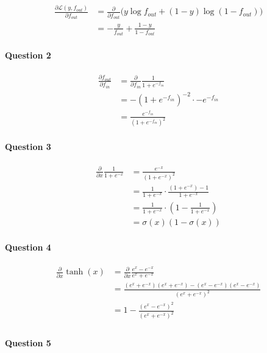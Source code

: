 \documentclass[
  a4paper,
]{article}
\begin{document}
\begin{align*}
\frac{\partial\mathcal{L}(y,  f_{out})}{\partial f_{out}}
&=\frac{\partial}{\partial f_{out}}\bigg(y\log f_{out}+(1-y)\log(1- f_{out})\bigg)\\
&=-\frac{y}{ f_{out}}+\frac{1-y}{1- f_{out}}
\end{align*}

\hypertarget{question-2}{%
\paragraph{Question 2}\label{question-2}}

\begin{align*}
\frac{\partial f_{out}}{\partial f_{in}}
&=\frac{\partial}{\partial f_{in}} \frac{1}{1+e^{- f_{in}}} \\
&=-(1+e^{- f_{in}})^{-2}\cdot -e^{- f_{in}} \\
&=\frac{e^{- f_{in}}}{(1+e^{- f_{in}})^{2}}
\end{align*}

\hypertarget{question-3}{%
\paragraph{Question 3}\label{question-3}}

\begin{align*}
\frac{\partial}{\partial x} \frac{1}{1+e^{-x}}
&=\frac{e^{-x}}{(1+e^{-x})^2} \\
&=\frac{1}{1+e^{-x}} \cdot \frac{(1+e^{-x})-1}{1+e^{-x}} \\
&=\frac{1}{1+e^{-x}} \cdot \left(1-\frac{1}{1+e^{-x}}\right) \\
&=\sigma(x)(1-\sigma(x))
\end{align*}

\hypertarget{question-4}{%
\paragraph{Question 4}\label{question-4}}

\begin{align*}
\frac{\partial}{\partial x}\tanh(x)
&=\frac{\partial}{\partial x}\frac{e^x-e^{-x}}{e^x+e^{-x}} \\
&=\frac{(e^x+e^{-x})(e^x+e^{-x})-(e^x-e^{-x})(e^x-e^{-x})}{(e^x+e^{-x})^2} \\
&=1-\frac{(e^x-e^{-x})^2}{(e^x+e^{-x})^2} \\
\end{align*}

\hypertarget{question-5}{%
\paragraph{Question 5}\label{question-5}}
\end{document}
